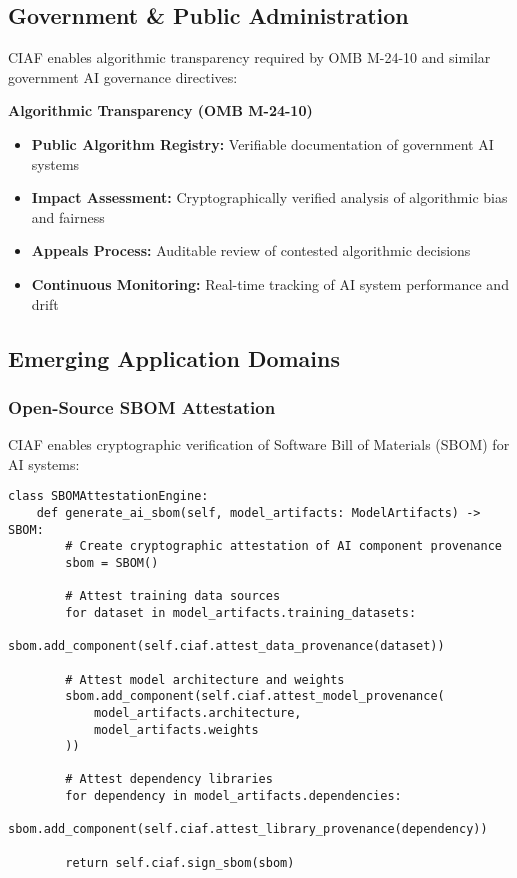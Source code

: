 \documentclass[12pt,a4paper]{article}
\begin{document}
\subsection{Government \& Public Administration}

CIAF enables algorithmic transparency required by OMB M-24-10 and similar government AI governance directives:

\begin{valuebox}
\textbf{Algorithmic Transparency (OMB M-24-10)}
\begin{itemize}
\item \textbf{Public Algorithm Registry:} Verifiable documentation of government AI systems
\item \textbf{Impact Assessment:} Cryptographically verified analysis of algorithmic bias and fairness
\item \textbf{Appeals Process:} Auditable review of contested algorithmic decisions
\item \textbf{Continuous Monitoring:} Real-time tracking of AI system performance and drift
\end{itemize}
\end{valuebox}

\subsection{Emerging Application Domains}

\subsubsection{Open-Source SBOM Attestation}

CIAF enables cryptographic verification of Software Bill of Materials (SBOM) for AI systems:

\begin{lstlisting}[caption=SBOM Attestation Pattern]
class SBOMAttestationEngine:
    def generate_ai_sbom(self, model_artifacts: ModelArtifacts) -> SBOM:
        # Create cryptographic attestation of AI component provenance
        sbom = SBOM()
        
        # Attest training data sources
        for dataset in model_artifacts.training_datasets:
            sbom.add_component(self.ciaf.attest_data_provenance(dataset))
        
        # Attest model architecture and weights
        sbom.add_component(self.ciaf.attest_model_provenance(
            model_artifacts.architecture,
            model_artifacts.weights
        ))
        
        # Attest dependency libraries
        for dependency in model_artifacts.dependencies:
            sbom.add_component(self.ciaf.attest_library_provenance(dependency))
        
        return self.ciaf.sign_sbom(sbom)
\end{lstlisting}
\end{document}
